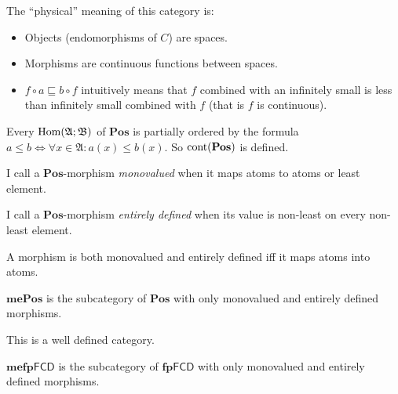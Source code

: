 \begin{rem}
  The ``physical'' meaning of this category is:
  \begin{itemize}
    \item Objects (endomorphisms of $C$) are spaces.
    
    \item Morphisms are continuous functions between spaces.
    
    \item $f \circ a \sqsubseteq b \circ f$ intuitively means that $f$
    combined with an infinitely small is less than infinitely small combined
    with $f$ (that is $f$ is continuous).
  \end{itemize}
\end{rem}

\begin{rem}
  Every $\operatorname{Hom} (\mathfrak{A}; \mathfrak{B})$ of $\mathbf{Pos}$
  is partially ordered by the formula $a \leqslant b \Leftrightarrow \forall x
  \in \mathfrak{A}: a (x) \leqslant b (x)$. So $\operatorname{cont}
  (\mathbf{Pos})$ is defined.
\end{rem}

\begin{defn}
  I call a $\mathbf{Pos}$-morphism \emph{monovalued} when it maps
  atoms to atoms or least element.
\end{defn}

\begin{defn}
  I call a $\mathbf{Pos}$-morphism \emph{entirely defined} when
  its value is non-least on every non-least element.
\end{defn}

\begin{obvious}
A morphism is both monovalued and entirely defined iff it maps atoms into
atoms.
\end{obvious}


\begin{defn}
  $\mathbf{mePos}$ is the subcategory of $\mathbf{Pos}$ with
  only monovalued and entirely defined morphisms.
\end{defn}

\begin{obvious}
This is a well defined category.{\hspace*{\fill}}{\medskip}
\end{obvious}

\begin{defn}
  $\mathbf{mefp} \mathsf{FCD}$ is the subcategory of
  $\mathbf{fp} \mathsf{FCD}$ with only monovalued and entirely
  defined morphisms.
\end{defn}

